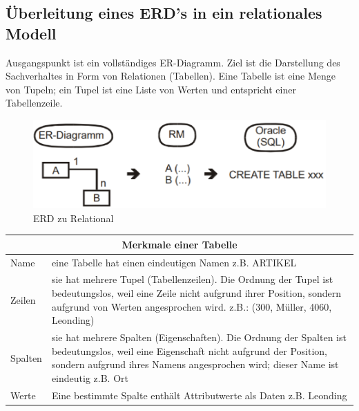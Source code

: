 \subsection{Überleitung eines ERD’s in ein relationales Modell}

Ausgangspunkt ist ein vollständiges ER-Diagramm. Ziel ist die Darstellung des Sachverhaltes in Form von Relationen (Tabellen). Eine Tabelle ist eine Menge von Tupeln; ein Tupel ist eine Liste von Werten und entspricht einer Tabellenzeile.

\begin{figure}[h]
    \centering
    \includegraphics[width=.8\textwidth]{Content/images/modellierung/erdtor.png}
    \caption{ERD zu Relational}
    \label{fig:modellierung:erdtor}
\end{figure}

\begin{center}
    \begin{tabular}{ | l | p{} |}
        \hline
        \multicolumn{2}{|c|}{\textbf{Merkmale einer Tabelle}} \\ \hline
        Name & eine Tabelle hat einen eindeutigen Namen
        z.B. ARTIKEL \\ \hline
        Zeilen & sie hat mehrere Tupel (Tabellenzeilen). Die Ordnung der Tupel ist bedeutungslos, weil eine Zeile nicht aufgrund ihrer Position, sondern aufgrund von Werten angesprochen wird.
        z.B.: (300, Müller, 4060, Leonding)        \\ \hline
        Spalten & sie hat mehrere Spalten (Eigenschaften). Die Ordnung der Spalten ist bedeutungslos, weil eine Eigenschaft nicht aufgrund der Position, sondern aufgrund ihres Namens angesprochen wird; dieser Name ist eindeutig
        z.B. Ort   \\ \hline     
        Werte & Eine bestimmte Spalte enthält Attributwerte als Daten
        z.B. Leonding\\ \hline        
    \end{tabular}
\end{center}

